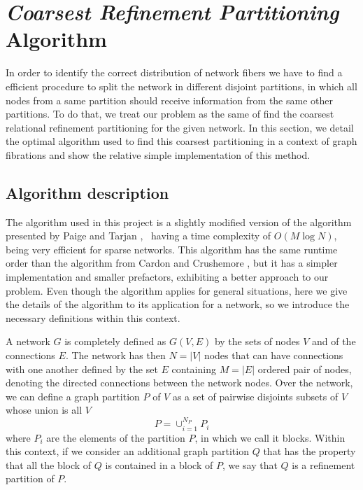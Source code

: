 \documentclass[12pt]{diazessay} %
\begin{document}

\section{\textit{Coarsest Refinement Partitioning }Algorithm}

In order to identify the correct distribution of network fibers we have to find a efficient procedure to split the network in different disjoint partitions, in which all nodes from a same partition should receive information from the same other partitions. To do that, we treat our problem as the same of find the coarsest relational refinement partitioning for the given network. In this section, we detail the optimal algorithm used to find this coarsest partitioning in a context of graph fibrations and show the relative simple implementation of this method.

\subsection{Algorithm description}

The algorithm used in this project is a slightly modified version of the algorithm presented by Paige and Tarjan \cite{Tarjan1987}, \ having a time complexity of $O(M\log N)$, being very efficient for sparse networks. This algorithm has the same runtime order than the algorithm from Cardon and Crushemore \cite{Cardon1982}, but it has a simpler implementation and smaller prefactors, exhibiting a better approach to our problem. Even though the algorithm applies for general situations, here we give the details of the algorithm to its application for a network, so we introduce the necessary definitions within this context.

A network $G$ is completely defined as $G(V, E)$ by the sets of nodes $V$ and of the connections $E$. The network has then $N = |V|$ nodes that can have connections with one another defined by the set $E$ containing $M = |E|$ ordered pair of nodes, denoting the directed connections between the network nodes. Over the network, we can define a graph partition $P$ of $V$ as a set of pairwise disjoints subsets of $V$ whose union is all $V$
\begin{equation}
	P = \cup_{i=1}^{N_P} P_i
\end{equation}
where $P_i$ are the elements of the partition $P$, in which we call it blocks. Within this context, if we consider an additional graph partition $Q$ that has the property that all the block of $Q$ is contained in a block of $P$, we say that $Q$ is a refinement partition of $P$.
\end{document}
